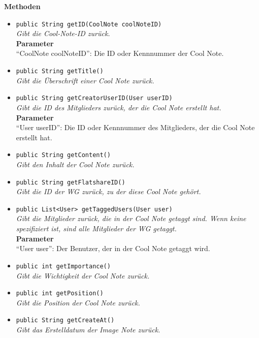 	\textbf{Methoden}
	\begin{itemize}
		\item\texttt{{public String getID(CoolNote coolNoteID)}}\\
		\textit{Gibt die Cool-Note-ID zurück.}\\
		\textbf{Parameter}\\
		“CoolNote coolNoteID”: Die ID oder Kennnummer der Cool Note.\\
		
		\item\texttt{{public String getTitle()}}\\
		\textit{Gibt die Überschrift einer Cool Note zurück.}\\
		
		\item\texttt{{public String getCreatorUserID(User userID)}}\\
		\textit{Gibt die ID des Mitglieders zurück, der die Cool Note erstellt hat.}\\
		\textbf{Parameter}\\
		“User userID”: Die ID oder Kennnummer des Mitglieders, der die Cool Note erstellt hat.\\
		
		\item\texttt{{public String getContent()}}\\
		\textit{Gibt den Inhalt der Cool Note zurück.}\\
		
		\item\texttt{{public String getFlatshareID()}}\\
		\textit{Gibt die ID der WG zurück, zu der diese Cool Note gehört.}\\
		
		\item\texttt{{public List<User> getTaggedUsers(User user)}}\\
		\textit{Gibt die Mitglieder zurück, die in der Cool Note getaggt sind. Wenn keine spezifiziert ist, sind alle Mitglieder der WG getaggt.}\\
		\textbf{Parameter}\\
		“User user”: Der Benutzer, der in der Cool Note getaggt wird.\\
		
		\item\texttt{public int getImportance()}\\
		\textit{Gibt die Wichtigkeit der Cool Note zurück.}
		
		\item\texttt{{public int getPosition()}}\\
		\textit{Gibt die Position der Cool Note zurück.}\\
		
		\item\texttt{{public String getCreateAt()}}\\
		\textit{Gibt das Erstelldatum der Image Note zurück.}\\
	\end{itemize}

